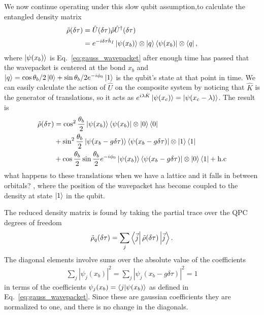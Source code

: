 \documentclass[10pt,
 amsmath,amssymb,
 aps,prb, twocolumn
]{revtex4-2}
\newcommand\sj[1]{ {\color{cyan} #1} }
\begin{document}
We now continue operating under this slow qubit assumption,to calculate the entangled density matrix
\begin{align}
    \tilde{\rho}(\delta\tau)& =  \hat{U}(\delta \tau) \hat{\rho}\hat{U}^{\dagger}(\delta\tau) \nonumber \\ 
    & = e^{-i\delta\tau \hat{h}_I}\ket{\psi (x_b)}\otimes \ket{q}\bra{\psi(x_b)}\otimes\bra{q},
\end{align}
where \mbox{$\ket{\psi(x_b)}$} is Eq.~\eqref{eq:gauss_wavepacket} after enough time has passed that the wavepacket is centered at the bond $x_b$ and \mbox{$\ket{q} = \cos{\theta_b/2}\ket{0}+\sin{\theta_b/2}e^{-i\phi_0}\ket{1}$} is the qubit's state at that point in time. We can easily calculate the action of $\hat{U}$ on the composite system by noticing that $\hat{K}$ is the generator of translations, so it acts as \mbox{$e^{i\lambda \hat{K}}\ket{\psi(x_c)} = \ket{\psi(x_c-\lambda)}$}. The result is 
\begin{align}
    \tilde{\rho}(\delta\tau) & =  \cos^2{\frac{\theta_b}{2}}\ket{\psi(x_b)}\bra{\psi(x_b)}\otimes \ket{0}\bra{0} \nonumber \\ 
    & + \sin^2{\frac{\theta_b}{2}}\ket{\psi(x_b-g\delta\tau)}\bra{\psi(x_b-g\delta\tau)}\otimes\ket{1}\bra{1} \nonumber \\ 
    & + \cos{\frac{\theta_b}{2}}\sin{\frac{\theta_b}{2}}e^{-i\phi_0}\ket{\psi(x_b)}\bra{\psi(x_b-g\delta\tau)}\otimes\ket{0}\bra{1} + \text{h.c}
\end{align}
\sj{what happens to these translations when we have a lattice and it falls in between orbitals?}, where the position of the wavepacket has become coupled to the density at state $\ket{1}$ in the qubit. 

The reduced density matrix is found by taking the partial trace over the QPC degrees of freedom
\begin{align}
    \tilde{\rho}_q(\delta\tau) = \sum_{j}\bra{\vec{j}}\tilde{\rho}(\delta\tau) \ket{\vec{j}}.
\end{align}
The diagonal elements involve sums over the absolute value of the coefficients
\begin{align}
    \sum_j |\psi_j(x_b)|^2 = \sum_j |\psi_j(x_b-g\delta\tau)|^2 = 1
\end{align}
in terms of the coefficients \mbox{$\psi_j(x_b)=\bra{j}\ket{\psi(x_b)}$} as defined in Eq.~\eqref{eq:gauss_wavepacket}. Since these are gaussian coefficients they are normalized to one, and there is no change in the diagonals.
\end{document}

